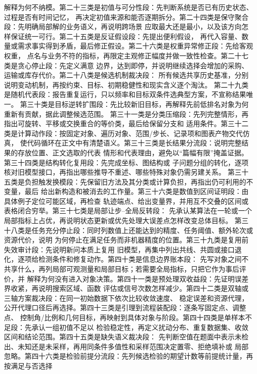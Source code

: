 \documentclass[UTF8,a4paper,12pt]{ctexart}
\begin{document}
解释为何不纳模。第二十三类是初值与可分性段：先判断系统是否已有历史状态、过程是否有时间记忆，
再决定初值来源和能否逐期拆分。第二十四类是保守聚合段：先明确局部解的业务语义，再说明跨场景
应取最大还是最小，以及该方向怎样保证统一可行。第二十五类是反证假设段：先提出便利假设，
再代入容量、数量或需求事实得到矛盾，最后修正假设。第二十六类是权重异常修正段：先给客观权重，
点名与业务不符的指标，再限定主观修正幅度并做一致性检查。第二十七类是贪心停止段：先定义满意
边界，达到即停，并说明继续选择会增加的采购、运输或库存代价。第二十八类是候选机制裁决段：
所有候选共享历史基准，分别说明变动机制，再按约束、目标、初期稳健性和现实含义逐个淘汰。
第二十九类是随机代表段：报告重复运行，只以频率和目标双条件选典型方案，不宣称结果唯一。
第三十类是目标逆转扩围段：先比较新旧目标，再解释先前低排名对象为何重新有贡献，据此调整候选范围。
第三十一类是分类压缩段：先列完整情形，再指出可旋转、平移或交换重合的等价类，最后给保留分支和
适用条件。第三十二类是计算动作段：按固定对象、遍历对象、范围/步长、记录项和图表产物交代仿真，
使代码循环在正文中有清楚语义。第三十三类是长结果分流段：说明完整结果的存放位置、正文选取的代表
情形和代表理由，避免以“篇幅有限”掩盖证据。第三十四类是结构转化复用段：先完成坐标、图结构或
子问题分组的转化，逐项核对旧模型接口，再指出哪些推导不重述、哪些特殊对象仍需另建关系。
第三十五类是负担触发换模段：先保留旧方法及其分类或计算负担，再指出仍可利用的不变量，最后
给出新构造和被消去的工作量。第三十六类是数值到区间证明段：由具体例子定位可能区域，再检查
轨迹端点、给出变量界，并用互不交叠的区间或表格闭合穷举。第三十七类是局部让步--全局反转段：
先承认某算法在一轮或一个局部指标上占优，再说明状态更新或优先处理大误差点怎样改变总体目标。
第三十八类是任务充分停止段：同时列数值上还能达到的精度、任务阈值、额外轮次或资源代价，说明
为何停止在满足任务而非机器精度的位置。第三十九类是复用前失效审计段：先说明新问本质上复用
旧模型，再集中列出共线、共圆或接口退化，逐项给检测条件和修复动作。第四十类是信息边界账本段：
先写对象之间不共享什么，再列局部可观测量和局部目标；若需要全局指标，只把它作为事后评价，并
解释为何没有进入对象决策。第四十一类是预处理双收益段：先证明误差界收紧，再说明搜索区域、函数
评估或信号次数怎样减少。第四十二类是双轴或三轴方案裁决段：在同一初始数据下依次比较收敛速度、
稳定误差和资源代理，公开代理口径后再选择。第四十三类是引理到流程装配段：逐条写固定点、调整点、
控制角/比例和几何目标，再映射到具体对象与阶段。第四十四类是单样本不足段：先承认一组初值不足以
检验稳定性，再定义扰动分布、重复数据集、收敛区间和结论范围。第四十五类是缺失语义裁决段：
先判断空值在题面中表示未检出、未知还是未采样，再用同条件多值性和采样范围决定置零、拒绝填补或
局部忽略。第四十六类是检验前提分流段：先列候选检验的期望计数等前提统计量，再按满足与否选择
\end{document}
